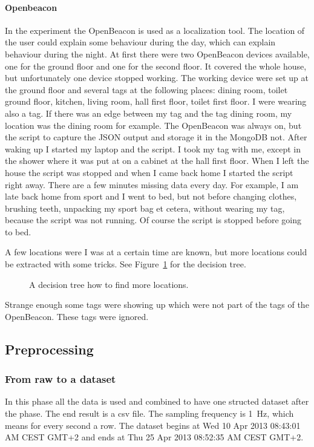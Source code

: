 		\paragraph{Openbeacon}
			In the experiment the OpenBeacon is used as a localization tool. The location of the user could explain some behaviour during the day, which can explain behaviour during the night. At first there were two OpenBeacon devices available, one for the ground floor and one for the second floor. It covered the whole house, but unfortunately one device stopped working. The working device were set up at the ground floor and several tags at the following places: dining room, toilet ground floor, kitchen, living room, hall first floor, toilet first floor. I were wearing also a tag. If there was an edge between my tag and the tag dining room, my location was the dining room for example. The OpenBeacon was always on, but the script to capture the JSON output and storage it in the MongoDB not. After waking up I started my laptop and the script. I took my tag with me, except in the shower where it was put at on a cabinet at the hall first floor. When I left the house the script was stopped and when I came back home I started the script right away. There are a few minutes missing data every day. For example, I am late back home from sport and I went to bed, but not before changing clothes, brushing teeth, unpacking my sport bag et cetera, without wearing my tag, because the script was not running. Of course the script is stopped before going to bed.
			
			A few locations were I was at a certain time are known, but more locations could be extracted with some tricks. See Figure~\ref{fig:decisiontree} for the decision tree.

				\begin{figure}[h!]
					
					\caption{A decision tree how to find more locations.}
					\label{fig:decisiontree}
				\end{figure}

				Strange enough some tags were showing up which were not part of the tags of the OpenBeacon. These tags were ignored.
		
		\clearpage
				
	\subsection{Preprocessing}
		\label{sec:preprocessing}
		\subsubsection{From raw to a dataset}
			\label{sec:rawdataset}
			In this phase all the data is used and combined to have one structed dataset after the phase. The end result is a csv file. The sampling frequency is \SI{1}{\hertz}, which means for every second a row. The dataset begins at Wed 10 Apr 2013 08:43:01 AM CEST GMT+2 and ends at Thu 25 Apr 2013 08:52:35 AM CEST GMT+2. 
			
